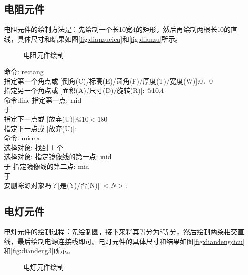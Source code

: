 \subsection{电阻元件}
电阻元件的绘制方法是：先绘制一个长10宽4的矩形，然后再绘制两根长10的直线，具体尺寸和结果如图\ref{fig:dianzucicu}和\ref{fig:dianzu}所示。

\noindent
\begin{figure}[htbp]
\centering
{}\hspace{30pt}
\caption{电阻元件绘制}
\end{figure}

\noindent
命令: rectang\\
指定第一个角点或 [倒角(C)/标高(E)/圆角(F)/厚度(T)/宽度(W)]:0，0\\
指定另一个角点或 [面积(A)/尺寸(D)/旋转(R)]: @10,4\\
命令:line 指定第一点: mid\\
于\\
指定下一点或 [放弃(U)]:$ @10<180$\\
指定下一点或 [放弃(U)]:\\
命令: mirror\\
选择对象: 找到 1 个\\
选择对象:  指定镜像线的第一点: mid\\
于 指定镜像线的第二点: mid\\
于\\
要删除源对象吗？[是(Y)/否(N)] $<N>:$\\

\subsection{电灯元件}
电灯元件的绘制过程：先绘制圆，接下来将其等分为8等分，然后绘制两条相交直线，最后绘制电源连接线即可。电灯元件的具体尺寸和结果如图\ref{fig:diandengcicu}和\ref{fig:diandeng3}所示。

\noindent
\begin{figure}[htbp]
\centering
{}\hspace{30pt}
\hspace{30pt}
\hspace{30pt}
\caption{电灯元件绘制}
\end{figure}

